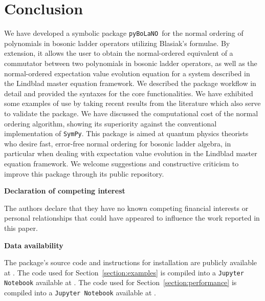 \documentclass[onecolumn, 12pt, sort&compress]{elsarticle}
\newcounter{bla}
\newcommand{\pybolano}{\texttt{pyBoLaNO}~}
\newenvironment{revision}{%
\color{red}
}
{}
\begin{document}

\section{Conclusion}\label{section:conclusion}

We have developed a symbolic package \pybolano for the normal ordering of polynomials in bosonic ladder operators utilizing Blasiak's formulae. By extension, it allows the user to obtain the normal-ordered equivalent of a commutator between two polynomials in bosonic ladder operators, as well as the normal-ordered expectation value evolution equation for a system described in the Lindblad master equation framework. We described the package workflow in detail and provided the syntaxes for the core functionalities. We have exhibited some examples of use by taking recent results from the literature which also serve to validate the package. We have discussed the computational cost of the normal ordering algorithm, \begin{revision}showing its superiority against the conventional implementation of \texttt{SymPy}.\end{revision} This package is aimed at quantum physics theorists who desire fast, error-free normal ordering for bosonic ladder algebra, in particular when dealing with expectation value evolution in the Lindblad master equation framework. We welcome suggestions and constructive criticism to improve this package through its public repository. 


\medskip
\noindent\textbf{Declaration of competing interest}
\medskip

The authors declare that they have no known competing financial interests or personal relationships that could have appeared to influence the work reported in this paper.

\medskip
\noindent\textbf{Data availability}
\medskip

The package's source code and instructions for installation are publicly available at \href{https://github.com/hendry24/pyBoLaNO}{}. The code used for Section~\ref{section:examples} is compiled into a \texttt{Jupyter Notebook} available at \href{https://github.com/hendry24/pyBoLaNO/blob/main/tutorial.ipynb}{}. \begin{revision}The code used for Section~\ref{section:performance} is compiled into a \texttt{Jupyter Notebook} available at \href{https://github.com/hendry24/pyBoLaNO/blob/main/benchmarks.ipynb}{}.\end{revision}
\end{document}
